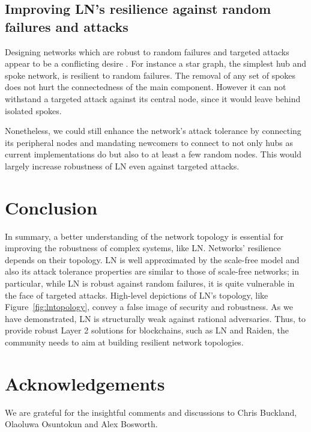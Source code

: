 \documentclass[a4paper]{article}
\theoremstyle{definition}
\begin{document}
\subsection{Improving LN's resilience against random failures and attacks}
Designing networks which are robust to random failures and targeted attacks appear to be a conflicting desire \cite{barabasi2016network}. For instance a star graph, the simplest hub and spoke network, is resilient to random failures. The removal of any set of spokes does not hurt the connectedness of the main component. However it can not withstand a targeted attack against its central node, since it would leave behind isolated spokes. 

Nonetheless, we could still enhance the network's attack tolerance by connecting its peripheral nodes \cite{barabasi2016network} and
mandating newcomers to connect to not only hubs as current implementations do but also to at least a few random nodes. This would largely increase robustness of LN even against targeted attacks.

\section{Conclusion}
In summary, a better understanding of the network topology is essential
for improving the robustness of complex systems, like LN. Networks' resilience depends on their topology. LN is well approximated by the scale-free model and also its attack tolerance properties are similar to those of scale-free networks; in particular, while LN is robust against random failures, it is quite vulnerable in the face of targeted attacks. 
High-level depictions of LN's topology, like Figure~\ref{fig:lntopology}, convey a false image of security and robustness. As we have demonstrated, LN is structurally weak against rational adversaries. Thus, to provide robust Layer 2 solutions for blockchains, such as LN and Raiden, the community needs to aim at building resilient network topologies.
\section{Acknowledgements}
We are grateful for the insightful comments and discussions to Chris Buckland, Olaoluwa Osuntokun and Alex Bosworth.



\end{document}
